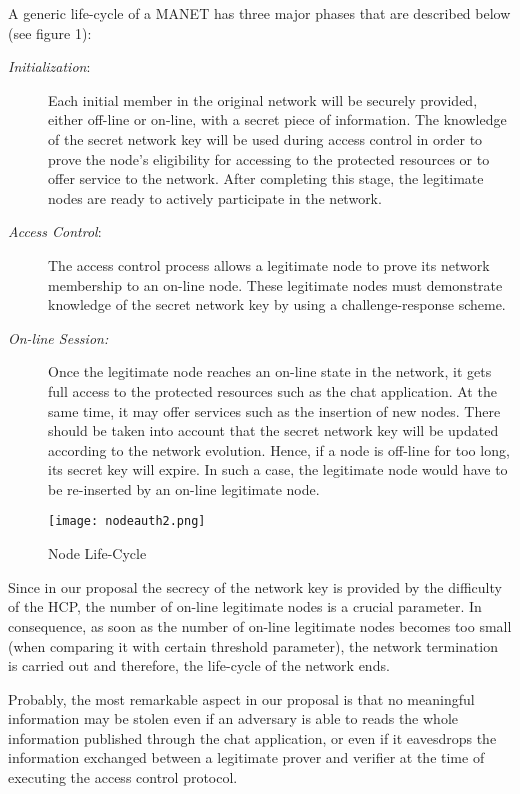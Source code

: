 \documentclass[conference]{IEEEtran}
\begin{document}
A generic life-cycle of a MANET has three major phases that are
described below (see figure 1):
\begin{description}
    \item [\emph{Initialization}:]   Each initial member in the original network will be securely provided,
either off-line or on-line, with a secret piece of information. The knowledge of the secret network key will be used during access
control in order to prove the node's eligibility for accessing to the protected resources or to offer service to the network. After completing this stage, the legitimate nodes are ready to actively participate in the network.
    \item [\emph{Access Control}:] The access control process allows a legitimate node to prove its network membership to an on-line node. These legitimate nodes must demonstrate knowledge of the secret network key by using a challenge-response scheme.
    \item [\emph{On-line Session:}] Once the legitimate node reaches an on-line state in the network, it gets full access to the protected resources such as the chat application. At the same time, it may offer services such as the insertion of new nodes. There should be taken into account that the secret network key will be updated according to the network evolution. Hence, if a node is off-line for too long, its secret key will expire. In such a case, the legitimate node would have to be re-inserted by an on-line legitimate node.

\end{description}

\begin{figure*}[htb]
  \centering
     \texttt{[image: nodeauth2.png]} \caption{Node Life-Cycle}
   \label{fig2}
\end{figure*}


Since in our proposal the secrecy of the network key is provided
by the difficulty of the HCP, the number of on-line legitimate
nodes is a crucial parameter. In consequence, as soon as the
number of on-line legitimate nodes becomes too small (when
comparing it with certain threshold parameter), the network
termination is carried out and therefore, the life-cycle of the
network ends.


Probably, the most remarkable aspect in our proposal is that no meaningful information may be stolen even if an adversary is able to reads the whole information published through the chat application, or even if it eavesdrops the information exchanged between a legitimate prover and verifier at the time of executing the access control protocol.
\end{document}

